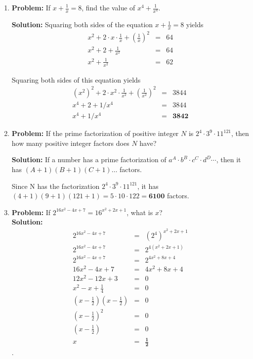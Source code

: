 \documentclass{article}
\begin{document}
\begin{enumerate}
\item \textbf{Problem:} If $\displaystyle x + \frac{1}{x} = 8$, find the value of $\displaystyle x^4 + \frac{1}{x^4}$.

\textbf{Solution:} Squaring both sides of the equation $x + \frac{1}{x} = 8$ yields \\
\begin{eqnarray*}
x^2 + 2\cdot x \cdot \frac{1}{x} + \left(\frac{1}{x} \right)^2 &=& 64 \\
x^2 + 2 + \frac{1}{x^2} &=& 64 \\
x^2 + \frac{1}{x^2} &=& 62
\end{eqnarray*}

Squaring both sides of this equation yields
\begin{eqnarray*}
(x^2)^2 + 2 \cdot x^2 \cdot \frac{1}{x^2} + \left(\frac{1}{x^2} \right)^2 &=& 3844 \\
x^4 + 2 + 1/x^4 &=& 3844 \\
x^4 + 1/x^4 &=& \mathbf{3842}
\end{eqnarray*}


\item \textbf{Problem:} If the prime factorization of positive integer $N$ is ${2}^{4} \cdot {3}^{9} \cdot {11}^{121}$, then how many positive integer factors does $N$ have?

\textbf{Solution:} If a number has a prime factorization of $a^A \cdot b^B \cdot c^C \cdot d^D \cdots$, then it has $(A+1)(B+1)(C+1) \ldots$ factors.

Since N has the factorization $2^4 \cdot 3^9 \cdot 11^{121}$, it has $(4+1)(9+1)(121+1) = 5 \cdot 10 \cdot 122 = \mathbf{6100}$ factors.

\item \textbf{Problem:} If $2^{16x^2 - 4x + 7} = 16^{x^2 + 2x + 1}$, what is $x$?  \\

\textbf{Solution:}
\begin{eqnarray*}
2^{16x^2 - 4x + 7} &=& (2^4)^{x^2 + 2x + 1} \\
2^{16x^2 - 4x + 7} &=& 2^{4(x^2 + 2x + 1)} \\
2^{16x^2 - 4x + 7} &=& 2^{4x^2 + 8x + 4} \\
16x^2 - 4x + 7 &=& 4x^2 + 8x + 4 \\
12x^2 - 12x + 3 &=& 0 \\
x^2 - x + \frac{1}{4} &=& 0 \\
(x-\frac{1}{2})(x-\frac{1}{2}) &=& 0 \\
(x-\frac{1}{2})^2 &=& 0 \\
(x - \frac{1}{2}) &=& 0 \\
x &=& \mathbf{\frac{1}{2}}
\end{eqnarray*}.



\end{enumerate}
\end{document}
